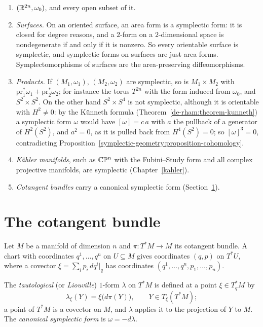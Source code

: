 \begin{example}\label{symplectic-geometry:example-manifolds}
\begin{enumerate}
\item $(\mathbb{R}^{2n}, \omega_0)$, and every open subset of it.
\item \emph{Surfaces.} On an oriented surface, an area form is a symplectic form: it is closed for degree reasons, and a $2$-form on a $2$-dimensional space is nondegenerate if and only if it is nonzero.
So every orientable surface is symplectic, and symplectic forms on surfaces are just area forms. Symplectomorphisms of surfaces are the area-preserving diffeomorphisms.
\item \emph{Products.} If $(M_1, \omega_1)$, $(M_2, \omega_2)$ are symplectic, so is $M_1 \times M_2$ with $\mathrm{pr}_1^*\omega_1 + \mathrm{pr}_2^*\omega_2$; for instance the torus $T^{2n}$ with the form
induced from $\omega_0$, and $S^2 \times S^2$. On the other hand $S^2 \times S^4$ is not symplectic, although it is orientable with $H^2 \neq 0$: by the K\"unneth formula
(Theorem~\ref{de-rham:theorem-kunneth}) a symplectic form $\omega$ would have $[\omega] = c\,a$ with $a$ the pullback of a generator of $H^2(S^2)$, and $a^2 = 0$, as it is pulled back from
$H^4(S^2) = 0$; so $[\omega]^3 = 0$, contradicting Proposition~\ref{symplectic-geometry:proposition-cohomology}.
\item \emph{K\"ahler manifolds}, such as $\mathbb{C}\mathbb{P}^n$ with the Fubini--Study form and all complex projective manifolds, are symplectic (Chapter~\ref{kahler}).
\item \emph{Cotangent bundles} carry a canonical symplectic form (Section~\ref{symplectic-geometry:section-cotangent}).
\end{enumerate}
\end{example}

\section{The cotangent bundle}\label{symplectic-geometry:section-cotangent}

Let $M$ be a manifold of dimension $n$ and $\pi \colon T^*M \to M$ its cotangent bundle. A chart with coordinates $q^1, \ldots, q^n$ on $U \subseteq M$ gives coordinates $(q, p)$ on $T^*U$, where a covector
$\xi = \sum_ip_i\,dq^i|_q$ has coordinates $(q^1, \ldots, q^n, p_1, \ldots, p_n)$.

\begin{definition}\label{symplectic-geometry:definition-tautological}
The \emph{tautological} (or \emph{Liouville}) $1$-form $\lambda$ on $T^*M$ is defined at a point $\xi \in T^*_qM$ by
\[
\lambda_\xi(Y) = \xi\bigl(d\pi(Y)\bigr), \qquad Y \in T_\xi(T^*M);
\]
a point of $T^*M$ is a covector on $M$, and $\lambda$ applies it to the projection of $Y$ to $M$. The \emph{canonical symplectic form} is $\omega = -d\lambda$.
\end{definition}

